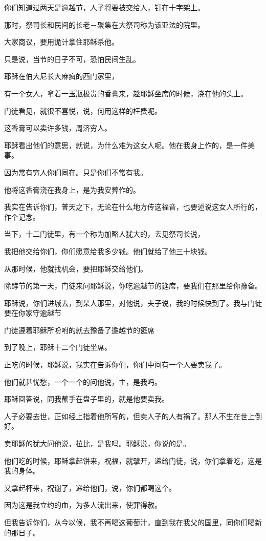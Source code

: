 \documentclass[12pt,oneside]{book}
\begin{document}
你们知道过两天是逾越节，人子将要被交给人，钉在十字架上。

那时，祭司长和民间的长老－聚集在大祭司称为该亚法的院里。

大家商议，要用诡计拿住耶稣杀他。

只是说，当节的日子不可，恐怕民间生乱。

耶稣在伯大尼长大麻疯的西门家里，

有一个女人，拿着一玉瓶极贵的香膏来，趁耶稣坐席的时候，浇在他的头上。

门徒看见，就很不喜悦，说，何用这样的枉费呢。

这香膏可以卖许多钱，周济穷人。

耶稣看出他们的意思，就说，为什么难为这女人呢。他在我身上作的，是一件美事。

因为常有穷人你们同在。只是你们不常有我。

他将这香膏浇在我身上，是为我安葬作的。

我实在告诉你们，普天之下，无论在什么地方传这福音，也要述说这女人所行的，作个记念。

当下，十二门徒里，有一个称为加略人犹大的，去见祭司长说，

我把他交给你们，你们愿意给我多少钱。他们就给了他三十块钱。

从那时候，他就找机会，要把耶稣交给他们。

除酵节的第一天，门徒来问耶稣说，你吃逾越节的筵席，要我们在那里给你豫备。

耶稣说，你们进城去，到某人那里，对他说，夫子说，我的时候快到了。我与门徒要在你家守逾越节

门徒遵着耶稣所吩咐的就去豫备了逾越节的筵席

到了晚上，耶稣十二个门徒坐席。

正吃的时候，耶稣说，我实在告诉你们，你们中间有一个人要卖我了。

他们就甚忧愁，一个一个的问他说，主，是我吗。

耶稣回答说，同我蘸手在盘子里的，就是他要卖我。

人子必要去世，正如经上指着他所写的，但卖人子的人有祸了。那人不生在世上倒好。

卖耶稣的犹大问他说，拉比，是我吗。耶稣说，你说的是。

他们吃的时候，耶稣拿起饼来，祝福，就擘开，递给门徒，说，你们拿着吃，这是我的身体。

又拿起杯来，祝谢了，递给他们，说，你们都喝这个。

因为这是我立约的血，为多人流出来，使罪得赦。

但我告诉你们，从今以候，我不再喝这葡萄汁，直到我在我父的国里，同你们喝新的那日子。
\end{document}

